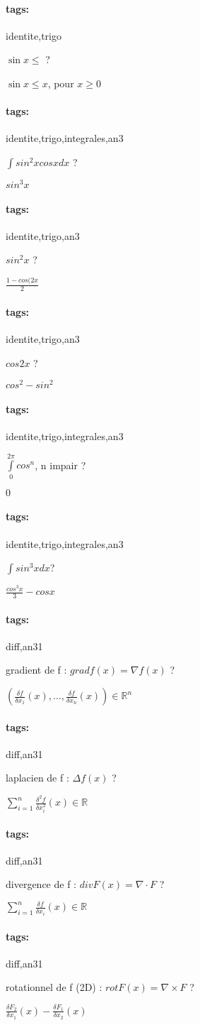 \documentclass[12pt]{article}
\newcommand*{\xfield}[1]{\begin{mdframed}\centering #1\end{mdframed}\bigskip}
\newenvironment{note}{}{}
\newcommand*{\tags}[1]{\paragraph{tags: }#1}
\begin{document}
\begin{note}
	\tags{identite,trigo}
	\xfield{$\sin x \le$ ?}
	\xfield{$\sin x \le x$, pour $x \ge 0$}
\end{note}

\begin{note}
	\tags{identite,trigo,integrales,an3}
	\xfield{$\int sin^2x cosx dx$ ?}
	\xfield{$sin^3x$}
\end{note}

\begin{note}
	\tags{identite,trigo,an3}
	\xfield{$sin^2x$ ?}
	\xfield{$\frac{1-cos(2x}{2}$}
\end{note}

\begin{note}
	\tags{identite,trigo,an3}
	\xfield{$cos 2x$ ?}
	\xfield{$cos^2-sin^2$}
\end{note}

\begin{note}
	\tags{identite,trigo,integrales,an3}
	\xfield{$\int\limits_0^{2\pi} cos^n$, n impair ?}
	\xfield{$0$}
\end{note}

\begin{note}
	\tags{identite,trigo,integrales,an3}
	\xfield{$\int sin^3x dx$?}
	\xfield{$\frac{cos^3 x}{3} - cos x$}
\end{note}

\begin{note}
	\tags{diff,an3}1
	\xfield{gradient de f : $grad f(x) = \nabla f(x)$ ?}
	\xfield{$\left(\frac{\delta f}{\delta x_1}(x),...,\frac{\delta f}{\delta x_n}(x)\right) \in \mathbb{R}^n$}
\end{note}

\begin{note}
	\tags{diff,an3}1
	\xfield{laplacien de f : $\Delta f(x)$ ?}
	\xfield{$\sum\limits_{i = 1}^n \frac{\delta^2f}{\delta x_i^2} (x) \in \mathbb{R}$}
\end{note}

\begin{note}
	\tags{diff,an3}1
	\xfield{divergence de f : $div F(x) = \nabla \cdot F$ ?}
	\xfield{$\sum\limits_{i = 1}^n \frac{\delta f}{\delta x_i} (x) \in \mathbb{R}$}
\end{note}

\begin{note}
	\tags{diff,an3}1
	\xfield{rotationnel de f (2D) : $rot F(x) = \nabla \times F$ ?}
	\xfield{$\frac{\delta F_2}{\delta x_1}(x)-\frac{\delta F_1}{\delta x_2}(x)$}
\end{note}
\end{document}
